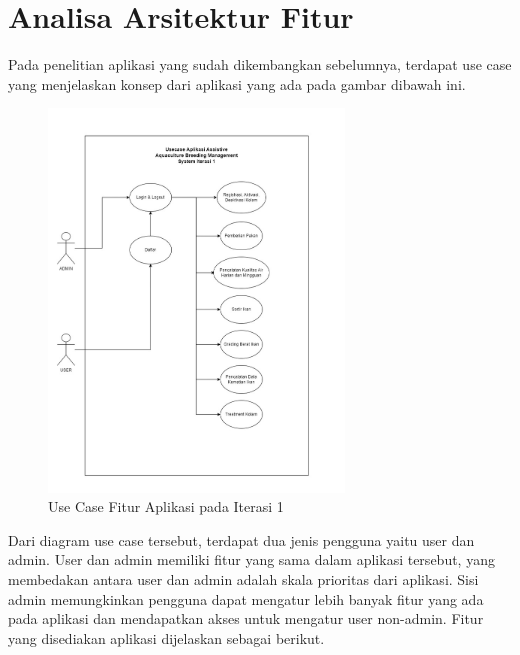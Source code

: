 \section{Analisa Arsitektur Fitur}

Pada penelitian aplikasi yang sudah dikembangkan sebelumnya, terdapat use case yang menjelaskan konsep dari aplikasi yang ada pada gambar dibawah ini.

\begin{figure}[H]
	\centering
	\includegraphics[width=0.7\textwidth]{gambar/akbar/usecase_iterasi_1.jpeg}
	\caption{Use Case Fitur Aplikasi pada Iterasi 1}
\end{figure}

Dari diagram use case tersebut, terdapat dua jenis pengguna yaitu user dan admin. User dan admin memiliki fitur yang sama dalam aplikasi tersebut, yang membedakan antara user dan admin adalah skala prioritas dari aplikasi. Sisi admin memungkinkan pengguna dapat mengatur lebih banyak fitur yang ada pada aplikasi dan mendapatkan akses untuk mengatur user non-admin. Fitur yang disediakan aplikasi dijelaskan sebagai berikut.

